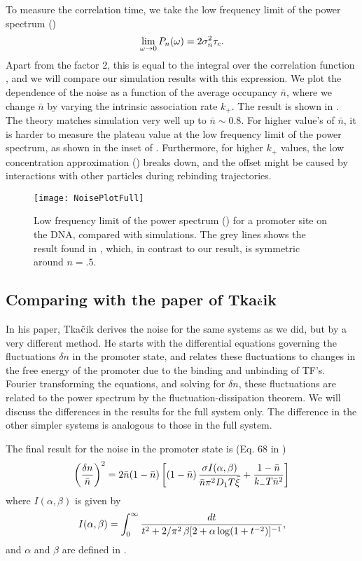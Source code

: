 To measure the correlation time, we take the low frequency limit of the power spectrum ()
\begin{equation}
 \lim_{\omega\to0} P_n(\omega) = 2 \sigma_n^2 \tau_c.
 \elabel{PowPro}
\end{equation}
Apart from the factor 2, this is equal to the integral over the correlation function , and we will compare our simulation results with this expression. We plot the dependence of the noise as a function of the average occupancy $\bar{n}$, where we change $\bar{n}$ by varying the intrinsic association rate $k_+$. The result is shown in . The theory matches simulation very well up to $\bar{n}\sim0.8$. For higher value's of $\bar{n}$, it is harder to measure the plateau value at the low frequency limit of the power spectrum, as shown in the inset of . Furthermore, for higher $k_+$ values, the low concentration approximation () breaks down, and the offset might be caused by interactions with other particles during rebinding trajectories.

\begin{figure}
\centering
\texttt{[image: NoisePlotFull]}
\caption{ Low frequency limit of the power spectrum () for a promoter site on the DNA, compared with simulations. The grey lines shows the result found in \cite{Tkacik2009}, which, in contrast to our result, is symmetric around $n=.5$.}
\end{figure}



\subsection{Comparing with the paper of Tka$\check{\bf c}$ik}
In his paper, Tka$\check{\rm c}$ik derives the noise for the same systems as we did, but by a very different method. He starts with the differential equations governing the fluctuations $\delta n$ in the promoter state, and relates these fluctuations to changes in the free energy of the promoter due to the binding and unbinding of TF's. Fourier transforming the equations, and solving for $\delta n$, these fluctuations are related to the power spectrum by the fluctuation-dissipation theorem. We will discuss the differences in the results for the full system only. The difference in the other simpler systems is analogous to those in the full system. 

The final result for the noise in the promoter state is (Eq. 68 in \cite{Tkacik2009}) 
\begin{equation}
 \elabel{NoiseProTka}
 \left( \frac{\delta n}{\bar{n}} \right)^2 = 2 \bar{n}(1-\bar{n})\left[ (1 -\bar{n}) \, \frac{\sigma I(\alpha,\beta)}{\bar{n} \pi^2 D_1 T \bar{\xi}} + \frac{1-\bar{n}}{k_- T \bar{n}^2} \right]
\end{equation}
where $I(\alpha,\beta)$ is given by
\begin{equation}
 \elabel{IntProTka}
 I(\alpha,\beta) = \int_0^{\infty} \frac{dt}{t^2 + 2/\pi^{2} \, \beta[2 + \alpha \, {\rm log}(1 + t^{-2})]^{-1}},
\end{equation}
and $\alpha$ and $\beta$ are defined in . 


